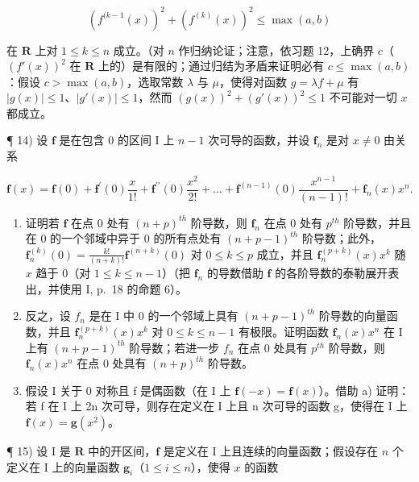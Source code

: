 \[
(f ^ {(k - 1} (x)) ^ {2} + (f ^ {(k)} (x)) ^ {2} \leqslant \max (a, b)
\]

在 \(\mathbf{R}\) 上对 \(1 \leqslant k \leqslant n\) 成立。（对 \(n\) 作归纳论证；注意，依习题 12，上确界 \(c\)（\((f'(x))^2\) 在 \(\mathbf{R}\) 上的）是有限的；通过归结为矛盾来证明必有 \(c \leqslant \max(a, b)\)：假设 \(c > \max(a, b)\)，选取常数 \(\lambda\) 与 \(\mu\)，使得对函数 \(g = \lambda f + \mu\) 有 \(|g(x)| \leqslant 1\)、\(|g'(x)| \leqslant 1\)，然而 \((g(x))^2 + (g'(x))^2 \leqslant 1\) 不可能对一切 \(x\) 都成立。

¶ 14) 设 \(\mathbf{f}\) 是在包含 0 的区间 I 上 \(n - 1\) 次可导的函数，并设 \(\mathbf{f}_n\) 是对 \(x \neq 0\) 由关系

\[
\mathbf {f} (x) = \mathbf {f} (0) + \mathbf {f} ^ {\prime} (0) \frac {x}{1 !} + \mathbf {f} ^ {\prime \prime} (0) \frac {x ^ {2}}{2 !} + \dots + \mathbf {f} ^ {(n - 1)} (0) \frac {x ^ {n - 1}}{(n - 1) !} + \mathbf {f} _ {n} (x) x ^ {n}.
\]

\begin{enumerate}
\def\labelenumi{\alph{enumi})}
\item
  证明若 \(\mathbf{f}\) 在点 0 处有 \((n + p)^{th}\) 阶导数，则 \(\mathbf{f}_n\) 在点 0 处有 \(p^{th}\) 阶导数，并且在 0 的一个邻域中异于 0 的所有点处有 \((n + p - 1)^{th}\) 阶导数；此外，\(\mathbf{f}_n^{(k)}(0) = \frac{k!}{(n + k)!}\mathbf{f}^{(n + k)}(0)\) 对 \(0 \leqslant k \leqslant p\) 成立，并且 \(\mathbf{f}_n^{(p + k)}(x)x^k\) 随 \(x\) 趋于 0（对 \(1 \leqslant k \leqslant n - 1\)）（把 \(\mathbf{f}_n\) 的导数借助 \(\mathbf{f}\) 的各阶导数的泰勒展开表出，并使用 I, p.~18 的命题 6）。
\item
  反之，设 \(f_{n}\) 是在 I 中 0 的一个邻域上具有 \((n + p - 1)^{th}\) 阶导数的向量函数，并且 \(\mathbf{f}_{n}^{(p+k)}(x)x^{k}\) 对 \(0 \leqslant k \leqslant n - 1\) 有极限。证明函数 \(\mathbf{f}_{n}(x)x^{n}\) 在 I 上有 \((n + p - 1)^{th}\) 阶导数；若进一步 \(f_{n}\) 在点 0 处具有 \(p^{th}\) 阶导数，则 \(\mathbf{f}_{n}(x)x^{n}\) 在点 0 处具有 \((n + p)^{th}\) 阶导数。
\item
  假设 I 关于 0 对称且 f 是偶函数（在 I 上 \(\mathbf{f}(-x) = \mathbf{f}(x)\)）。借助 a) 证明：若 f 在 I 上 2n 次可导，则存在定义在 I 上且 n 次可导的函数 g，使得在 I 上 \(\mathbf{f}(x) = \mathbf{g}(x^{2})\)。
\end{enumerate}

¶ 15) 设 I 是 \(\mathbf{R}\) 中的开区间，\(\mathbf{f}\) 是定义在 I 上且连续的向量函数；假设存在 \(n\) 个定义在 I 上的向量函数 \(\mathbf{g}_i\)（\(1 \leqslant i \leqslant n\)），使得 \(x\) 的函数

